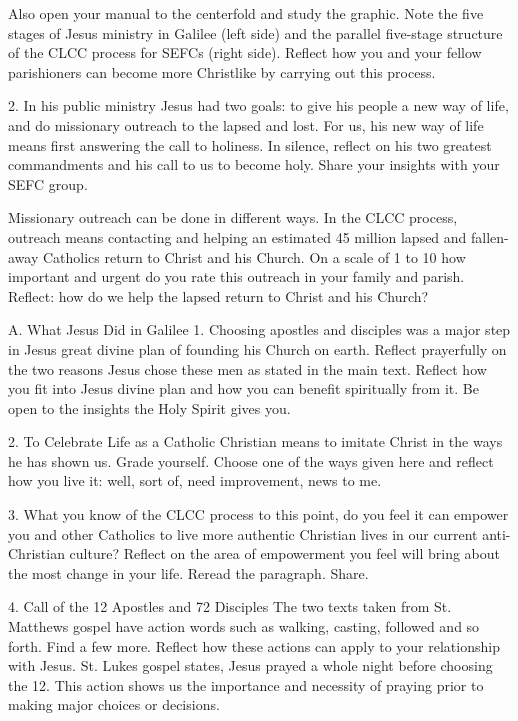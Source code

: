 \documentclass[oneside]{book}
\begin{document}
Also open your manual to the centerfold and study the graphic. Note the five
stages of Jesus ministry in Galilee (left side) and the parallel five-stage
structure of the CLCC process for SEFCs (right side). Reflect how you and your
fellow parishioners can become more Christlike by carrying out this process.

2. In his public ministry Jesus had two goals: to give his people a new way of
life, and do missionary outreach to the lapsed and lost. For us, his new way of
life means first answering the call to holiness. In silence, reflect on his two
greatest commandments and his call to us to become holy. Share your insights
with your SEFC group.

Missionary outreach can be done in different ways. In the CLCC process, outreach
means contacting and helping an estimated 45 million lapsed and fallen-away
Catholics return to Christ and his Church. On a scale of 1 to 10 how important
and urgent do you rate this outreach in your family and parish. Reflect: how do
we help the lapsed return to Christ and his Church?

A. What Jesus Did in Galilee 1. Choosing apostles and disciples was a major step
in Jesus great divine plan of founding his Church on earth. Reflect prayerfully
on the two reasons Jesus chose these men as stated in the main text. Reflect how
you fit into Jesus divine plan and how you can benefit spiritually from it. Be
open to the insights the Holy Spirit gives you.

2. To Celebrate Life as a Catholic Christian means to imitate Christ in the ways
he has shown us. Grade yourself. Choose one of the ways given here and reflect
how you live it: well, sort of, need improvement, news to me.

3. What you know of the CLCC process to this point, do you feel it can empower
you and other Catholics to live more authentic Christian lives in our current
anti-Christian culture? Reflect on the area of empowerment you feel will bring
about the most change in your life. Reread the paragraph. Share.

4. Call of the 12 Apostles and 72 Disciples The two texts taken from
St. Matthews gospel have action words such as walking, casting, followed and so
forth. Find a few more. Reflect how these actions can apply to your relationship
with Jesus. St. Lukes gospel states, Jesus prayed a whole night before choosing
the 12. This action shows us the importance and necessity of praying prior to
making major choices or decisions.
\end{document}
